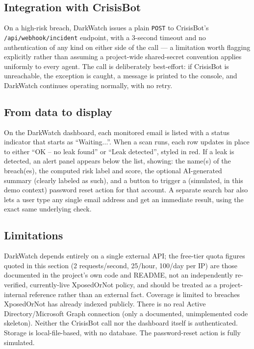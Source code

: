 \documentclass[12pt,a4paper]{report}
\newcommand{\code}[1]{\nolinkurl{#1}}
\begin{document}
\subsection*{Integration with CrisisBot}
On a high-risk breach, DarkWatch issues a plain \texttt{POST} to CrisisBot's \code{/api/webhook/incident} endpoint, with a 3-second timeout and no authentication of any kind on either side of the call --- a limitation worth flagging explicitly rather than assuming a project-wide shared-secret convention applies uniformly to every agent. The call is deliberately best-effort: if CrisisBot is unreachable, the exception is caught, a message is printed to the console, and DarkWatch continues operating normally, with no retry.

\subsection*{From data to display}
On the DarkWatch dashboard, each monitored email is listed with a status indicator that starts as ``Waiting...''. When a scan runs, each row updates in place to either ``OK -- no leak found'' or ``Leak detected'', styled in red. If a leak is detected, an alert panel appears below the list, showing: the name(s) of the breach(es), the computed risk label and score, the optional AI-generated summary (clearly labeled as such), and a button to trigger a (simulated, in this demo context) password reset action for that account. A separate search bar also lets a user type any single email address and get an immediate result, using the exact same underlying check.

\subsection*{Limitations}
DarkWatch depends entirely on a single external API; the free-tier quota figures quoted in this section (2 requests/second, 25/hour, 100/day per IP) are those documented in the project's own code and README, not an independently re-verified, currently-live XposedOrNot policy, and should be treated as a project-internal reference rather than an external fact. Coverage is limited to breaches XposedOrNot has already indexed publicly. There is no real Active Directory/Microsoft Graph connection (only a documented, unimplemented code skeleton). Neither the CrisisBot call nor the dashboard itself is authenticated. Storage is local-file-based, with no database. The password-reset action is fully simulated.
\end{document}
